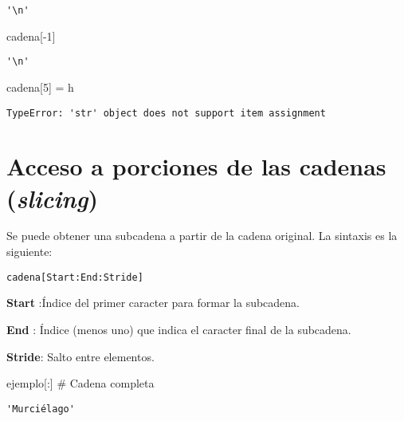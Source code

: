 \documentclass[
  letterpaper,
  DIV=11,
  numbers=noendperiod]{scrreprt}
\newenvironment{Shaded}{\begin{snugshade}}{\end{snugshade}}
\newcommand{\CommentTok}[1]{\textcolor[rgb]{0.37,0.37,0.37}{#1}}
\newcommand{\DecValTok}[1]{\textcolor[rgb]{0.68,0.00,0.00}{#1}}
\newcommand{\NormalTok}[1]{\textcolor[rgb]{0.00,0.23,0.31}{#1}}
\newcommand{\OperatorTok}[1]{\textcolor[rgb]{0.37,0.37,0.37}{#1}}
\newcommand{\StringTok}[1]{\textcolor[rgb]{0.13,0.47,0.30}{#1}}
\begin{document}
\begin{verbatim}
'\n'
\end{verbatim}

\begin{Shaded}
\begin{Highlighting}[]
\NormalTok{cadena[}\OperatorTok{{-}}\DecValTok{1}\NormalTok{]}
\end{Highlighting}
\end{Shaded}

\begin{verbatim}
'\n'
\end{verbatim}

\begin{Shaded}
\begin{Highlighting}[]
\NormalTok{cadena[}\DecValTok{5}\NormalTok{] }\OperatorTok{=} \StringTok{\textquotesingle{}h\textquotesingle{}}
\end{Highlighting}
\end{Shaded}

\begin{verbatim}
TypeError: 'str' object does not support item assignment
\end{verbatim}

\section{\texorpdfstring{Acceso a porciones de las cadenas
(\emph{slicing})}{Acceso a porciones de las cadenas (slicing)}}\label{acceso-a-porciones-de-las-cadenas-slicing}

Se puede obtener una subcadena a partir de la cadena original. La
sintaxis es la siguiente:

\texttt{cadena{[}Start:End:Stride{]}}

\textbf{Start} :Índice del primer caracter para formar la subcadena.

\textbf{End} : Índice (menos uno) que indica el caracter final de la
subcadena.

\textbf{Stride}: Salto entre elementos.

\begin{Shaded}
\begin{Highlighting}[]
\NormalTok{ejemplo[:] }\CommentTok{\# Cadena completa}
\end{Highlighting}
\end{Shaded}

\begin{verbatim}
'Murciélago'
\end{verbatim}
\end{document}
